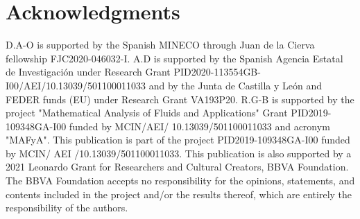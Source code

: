 \documentclass[final,11pt,a4paper,reqno]{amsart}
\theoremstyle{definition}
\begin{document}
\section*{Acknowledgments}
\noindent  D.A-O is supported by the Spanish MINECO through Juan de la Cierva fellowship FJC2020-046032-I. 
A.D is supported by the Spanish Agencia Estatal de Investigaci\'{o}n under Research Grant PID2020-113554GB-I00/AEI/10.13039/501100011033 and by the Junta de Castilla y Le\'{o}n and FEDER funds (EU) under
Research Grant VA193P20. R.G-B is supported by the project "Mathematical Analysis of Fluids
and Applications" Grant PID2019-109348GA-I00 funded by MCIN/AEI/ 10.13039/501100011033 and
acronym "MAFyA". This publication is part of the project PID2019-109348GA-I00 funded by MCIN/ AEI
/10.13039/501100011033. This publication is also supported by a 2021 Leonardo Grant for Researchers
and Cultural Creators, BBVA Foundation. The BBVA Foundation accepts no responsibility for the opinions, statements, and contents included in the project and/or the results thereof, which are entirely the
responsibility of the authors.
\end{document}
